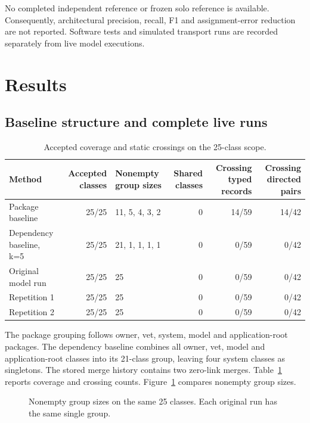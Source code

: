 No completed independent reference or frozen solo reference is available. Consequently, architectural precision, recall, F1 and assignment-error reduction are not reported. Software tests and simulated transport runs are recorded separately from live model executions.

\section{Results}

\subsection{Baseline structure and complete live runs}

\begin{table}[t]
\centering
\caption{Accepted coverage and static crossings on the 25-class scope.}
\label{tab:coverage}
\begin{tabular}{@{}p{}rp{}rrr@{}}
\hline
Method & Accepted classes & Nonempty group sizes & Shared classes & Crossing typed records & Crossing directed pairs \\
\hline
Package baseline & 25/25 & 11, 5, 4, 3, 2 & 0 & 14/59 & 14/42 \\
Dependency baseline, k=5 & 25/25 & 21, 1, 1, 1, 1 & 0 & 0/59 & 0/42 \\
Original model run & 25/25 & 25 & 0 & 0/59 & 0/42 \\
Repetition 1 & 25/25 & 25 & 0 & 0/59 & 0/42 \\
Repetition 2 & 25/25 & 25 & 0 & 0/59 & 0/42 \\
\hline
\end{tabular}
\end{table}


The package grouping follows owner, vet, system, model and application-root packages. The dependency baseline combines all owner, vet, model and application-root classes into its 21-class group, leaving four system classes as singletons. The stored merge history contains two zero-link merges. Table~\ref{tab:coverage} reports coverage and crossing counts. Figure~\ref{fig:group_sizes} compares nonempty group sizes.

\begin{figure}[t]
\centering

\caption{Nonempty group sizes on the same 25 classes. Each original run has the same single group.}
\label{fig:group_sizes}
\end{figure}


